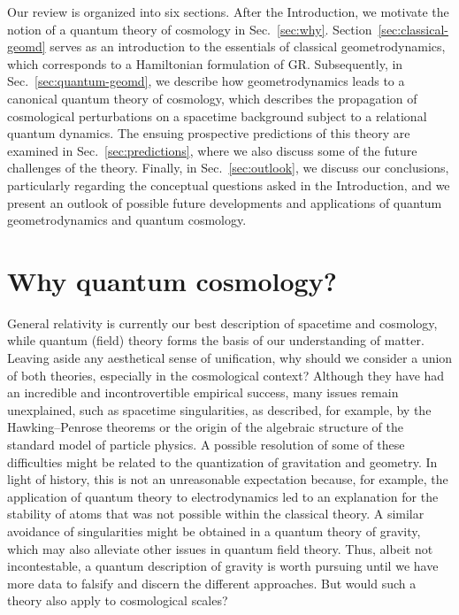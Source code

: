 \documentclass[12pt]{iopart}
\begin{document}
Our review is organized into six sections. After the Introduction, we motivate the notion of a quantum theory of cosmology in Sec.~\ref{sec:why}. Section~\ref{sec:classical-geomd} serves as an introduction to the essentials of classical geometrodynamics, which corresponds to a Hamiltonian formulation of GR. Subsequently, in Sec.~\ref{sec:quantum-geomd}, we describe how geometrodynamics leads to a canonical quantum theory of cosmology, which describes the propagation of cosmological perturbations on a spacetime background subject to a relational quantum dynamics. The ensuing prospective predictions of this theory are examined in Sec.~\ref{sec:predictions}, where we also discuss some of the future challenges of the theory. Finally, in Sec.~\ref{sec:outlook}, we discuss our conclusions, particularly regarding the conceptual questions asked in the Introduction, and we present an outlook of possible future developments and applications of quantum geometrodynamics and quantum cosmology.
 
\section{\label{sec:why}Why quantum cosmology?}
General relativity is currently our best description of spacetime and cosmology, while quantum (field) theory forms the basis of our understanding of matter. Leaving aside any aesthetical sense of unification, why should we consider a union of both theories, especially in the cosmological context? Although they have had an incredible and incontrovertible empirical success, many issues remain unexplained, such as spacetime singularities, as described, for example, by the Hawking--Penrose theorems \citep{Hawking:1996jh,Senovilla:1998oua} or the origin of the algebraic structure of the standard model of particle physics. A possible resolution of some of these difficulties might be related to the quantization of gravitation and geometry. In light of history, this is not an unreasonable expectation because, for example, the application of quantum theory to electrodynamics led to an explanation for the stability of atoms that was not possible within the classical theory. A similar avoidance of singularities might be obtained in a quantum theory of gravity, which may also alleviate other issues in quantum field theory. Thus, albeit not incontestable, a quantum description of gravity is worth pursuing until we have more data to falsify and discern the different approaches. But would such a theory also apply to cosmological scales?
\end{document}
